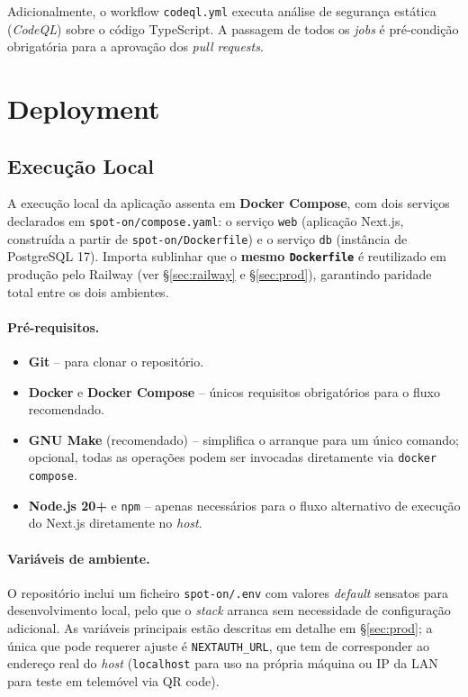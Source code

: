 \documentclass[11pt,a4paper]{article}
\begin{document}
Adicionalmente, o workflow \texttt{codeql.yml} executa análise de segurança
estática (\emph{CodeQL}) sobre o código TypeScript. A passagem de todos os
\emph{jobs} é pré-condição obrigatória para a aprovação dos \emph{pull
    requests}.

\section{Deployment}

\subsection{Execução Local}\label{sec:local}

A execução local da aplicação assenta em \textbf{Docker Compose}, com dois
serviços declarados em \texttt{spot-on/compose.yaml}: o serviço \texttt{web}
(aplicação Next.js, construída a partir de \texttt{spot-on/Dockerfile}) e o
serviço \texttt{db} (instância de PostgreSQL 17). Importa sublinhar que o
\textbf{mesmo \texttt{Dockerfile}} é reutilizado em produção pelo Railway
(ver \S\ref{sec:railway} e \S\ref{sec:prod}), garantindo paridade total
entre os dois ambientes.

\paragraph{Pré-requisitos.}
\begin{itemize}[leftmargin=*]
    \item \textbf{Git} -- para clonar o repositório.
    \item \textbf{Docker} e \textbf{Docker Compose} -- únicos requisitos
          obrigatórios para o fluxo recomendado.
    \item \textbf{GNU Make} (recomendado) -- simplifica o arranque para um
          único comando; opcional, todas as operações podem ser invocadas
          diretamente via \texttt{docker compose}.
    \item \textbf{Node.js 20+} e \texttt{npm} -- apenas necessários para o
          fluxo alternativo de execução do Next.js diretamente no \emph{host}.
\end{itemize}

\paragraph{Variáveis de ambiente.}
O repositório inclui um ficheiro \texttt{spot-on/.env} com valores
\emph{default} sensatos para desenvolvimento local, pelo que o \emph{stack}
arranca sem necessidade de configuração adicional. As variáveis principais
estão descritas em detalhe em \S\ref{sec:prod}; a única que pode requerer
ajuste é \texttt{NEXTAUTH\_URL}, que tem de corresponder ao endereço real do
\emph{host} (\texttt{localhost} para uso na própria máquina ou IP da LAN
para teste em telemóvel via QR code).
\end{document}

